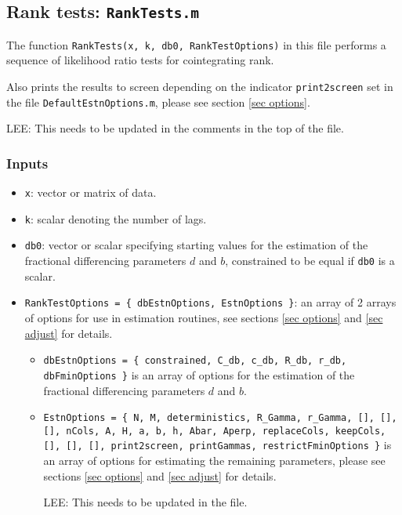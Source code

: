 \documentclass[12pt]{article}
\begin{document}
\subsection{Rank tests: \texttt{RankTests.m}\label{sec rank}}

The function \texttt{RankTests(x, k, db0, RankTestOptions)} in this file performs a sequence of likelihood ratio tests for cointegrating rank.

Also prints the results to screen depending on the indicator \texttt{print2screen} set in the file \texttt{DefaultEstnOptions.m}, please see section \ref{sec options}.

LEE: This needs to be updated in the comments in the top of the file.


\subsubsection*{Inputs}

\begin{itemize}

\item \texttt{x}: vector or matrix of data.

\item \texttt{k}: scalar denoting the number of lags.

\item \texttt{db0}: vector or scalar specifying starting values for the estimation of the fractional differencing parameters $d$ and $b$, constrained to be equal if \texttt{db0} is a scalar.

\item \texttt{RankTestOptions = \{ dbEstnOptions, EstnOptions \}}: an array of 2 arrays of options for use in estimation routines, see sections \ref{sec options} and \ref{sec adjust} for details.

\begin{itemize}

\item \texttt{dbEstnOptions = \{ constrained, C\_db, c\_db, R\_db, r\_db, dbFminOptions \}} is an array of options for the estimation of the fractional differencing parameters $d$ and $b$. 

\item \texttt{EstnOptions = \{ N, M, deterministics, R\_Gamma, r\_Gamma, [], [], [], nCols, A, H, a, b, h, Abar, Aperp, replaceCols, keepCols, [], [], [], print2screen, printGammas, restrictFminOptions \}} is an array of options for estimating the remaining parameters, please see sections \ref{sec options} and \ref{sec adjust} for details.

LEE: This needs to be updated in the file.

\end{itemize}
\end{itemize}
\end{document}
